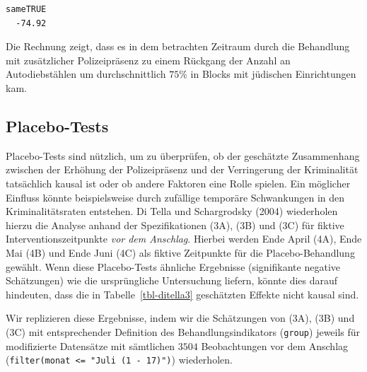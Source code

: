 \documentclass[
  a4paper,
  DIV=11,
  oneside]{scrreprt}
\begin{document}
\begin{verbatim}
sameTRUE 
  -74.92 
\end{verbatim}

Die Rechnung zeigt, dass es in dem betrachten Zeitraum durch die
Behandlung mit zusätzlicher Polizeipräsenz zu einem Rückgang der Anzahl
an Autodiebstählen um durchschnittlich \(75\%\) in Blocks mit jüdischen
Einrichtungen kam.

\subsection{Placebo-Tests}\label{placebo-tests}

Placebo-Tests sind nützlich, um zu überprüfen, ob der geschätzte
Zusammenhang zwischen der Erhöhung der Polizeipräsenz und der
Verringerung der Kriminalität tatsächlich kausal ist oder ob andere
Faktoren eine Rolle spielen. Ein möglicher Einfluss könnte
beispielsweise durch zufällige temporäre Schwankungen in den
Kriminalitätsraten entstehen. Di Tella und Schargrodsky (2004)
wiederholen hierzu die Analyse anhand der Spezifikationen (3A), (3B) und
(3C) für fiktive Interventionszeitpunkte \emph{vor dem Anschlag}.
Hierbei werden Ende April (4A), Ende Mai (4B) und Ende Juni (4C) als
fiktive Zeitpunkte für die Placebo-Behandlung gewählt. Wenn diese
Placebo-Tests ähnliche Ergebnisse (signifikante negative Schätzungen)
wie die ursprüngliche Untersuchung liefern, könnte dies darauf
hindeuten, dass die in Tabelle~\ref{tbl-ditella3} geschätzten Effekte
nicht kausal sind.

Wir replizieren diese Ergebnisse, indem wir die Schätzungen von (3A),
(3B) und (3C) mit entsprechender Definition des Behandlungsindikators
(\texttt{group}) jeweils für modifizierte Datensätze mit sämtlichen
\(3504\) Beobachtungen vor dem Anschlag
(\texttt{filter(monat\ \textless{}=\ "Juli\ (1\ -\ 17)")}) wiederholen.
\end{document}
